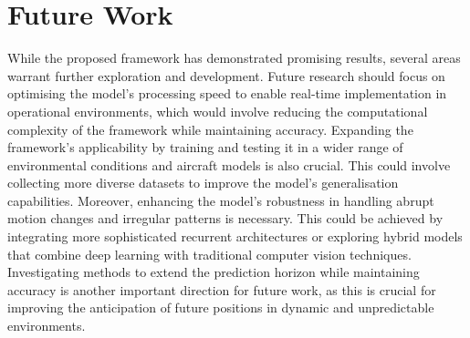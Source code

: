 \documentclass[12pt,oneside]{book} %
\begin{document}
\section{Future Work}
While the proposed framework has demonstrated promising results, several areas
warrant further exploration and development. Future research should focus on
optimising the model's processing speed to enable real-time implementation in
operational environments, which would involve reducing the computational
complexity of the framework while maintaining accuracy. Expanding the
framework's applicability by training and testing it in a wider range of
environmental conditions and aircraft models is also crucial. This could
involve collecting more diverse datasets to improve the model's generalisation
capabilities. Moreover, enhancing the model's robustness in handling abrupt
motion changes and irregular patterns is necessary. This could be achieved by
integrating more sophisticated recurrent architectures or exploring hybrid
models that combine deep learning with traditional computer vision techniques.
Investigating methods to extend the prediction horizon while maintaining
accuracy is another important direction for future work, as this is crucial for
improving the anticipation of future positions in dynamic and unpredictable
environments. 

\end{document}
